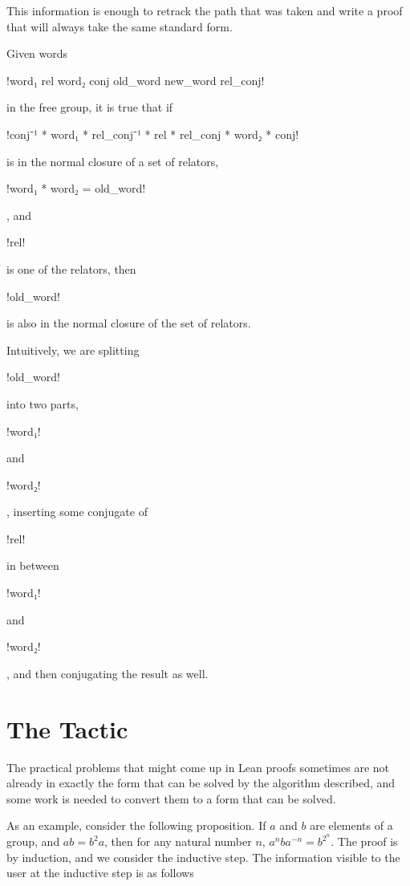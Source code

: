 \documentclass[12pt]{article} %
\theoremstyle{definition}
\theoremstyle{definition}
\theoremstyle{definition}
\theoremstyle{definition}
\theoremstyle{definition}
\theoremstyle{definition}
\begin{document}
This information is enough to retrack the path that was taken and write a
proof that will always take the same standard form.

Given words \begin{lstinline} !word₁ rel word₂ conj old_word new_word rel_conj! \end{lstinline}
in the free group, it is true that if
\begin{lstinline} !conj⁻¹ * word₁ * rel_conj⁻¹ * rel * rel_conj * word₂ * conj! \end{lstinline}
is in the normal closure of a set of relators, \begin{lstinline}!word₁ * word₂ = old_word!\end{lstinline},
and \begin{lstinline}!rel!\end{lstinline} is
one of the relators, then \begin{lstinline}!old_word!\end{lstinline} is also in the
normal closure of the set of relators.

Intuitively, we are splitting \begin{lstinline}!old_word!\end{lstinline} into two parts,
\begin{lstinline}!word₁!\end{lstinline} and \begin{lstinline}!word₂!\end{lstinline},
inserting some conjugate of \begin{lstinline}!rel!\end{lstinline} in between
\begin{lstinline}!word₁!\end{lstinline} and \begin{lstinline}!word₂!\end{lstinline},
and then conjugating the result as well.

\section{The Tactic}\label{tacdescript}

The practical problems that might come up in Lean proofs sometimes are not already in
exactly the form that can be solved by the algorithm described, and some work
is needed to convert them to a form that can be solved.

As an example, consider the following proposition. If $a$ and $b$ are elements
of a group, and $ab = b^2a$, then for any natural number $n$, $a^nba^{-n} = b^{2^n}$.
The proof is by induction, and we consider the inductive step. The information
visible to the user at the inductive step is as follows
\end{document}
